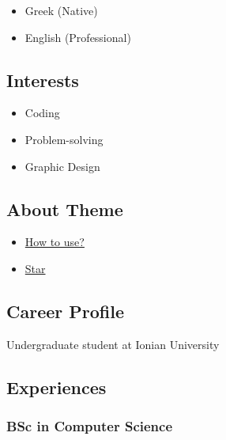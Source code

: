 \documentclass[
  english,
]{article}
\providecommand{\tightlist}{%
  \setlength{\itemsep}{0pt}\setlength{\parskip}{0pt}}
\begin{document}
\begin{itemize}
\tightlist
\item
  Greek {(Native)}
\item
  English {(Professional)}
\end{itemize}

\hypertarget{interests}{%
\subsection{Interests}\label{interests}}

\begin{itemize}
\tightlist
\item
  Coding
\item
  Problem-solving
\item
  Graphic Design
\end{itemize}

\hypertarget{about-theme}{%
\subsection{About Theme}\label{about-theme}}

\begin{itemize}
\tightlist
\item
  \href{https://www.youtube.com/watch?v=Jnmj1dXDbNk}{How to use?}
\item
  \href{https://github.com/sharu725/online-cv}{Star}
\end{itemize}

\hypertarget{career-profile}{%
\subsection{\texorpdfstring{{ \emph{} \emph{} } Career
Profile}{    Career Profile}}\label{career-profile}}

Undergraduate student at Ionian University

\hypertarget{experiences}{%
\subsection{\texorpdfstring{{ \emph{} \emph{} }
Experiences}{    Experiences}}\label{experiences}}

\hypertarget{bsc-in-computer-science-1}{%
\subsubsection{BSc in Computer
Science}\label{bsc-in-computer-science-1}}
\end{document}

